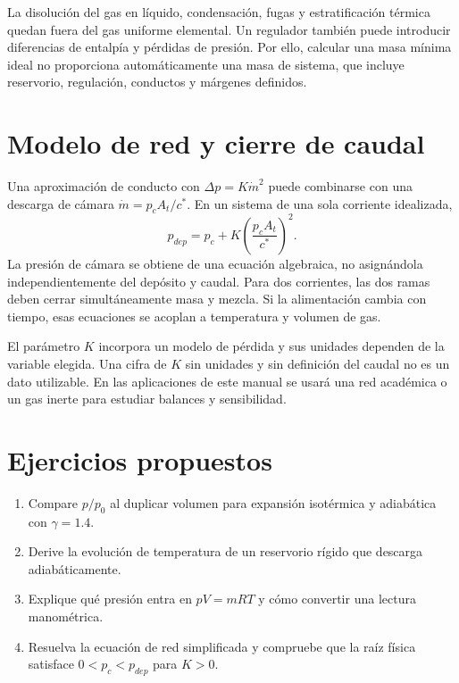 La disolución del gas en líquido, condensación, fugas y estratificación térmica quedan fuera del gas uniforme elemental. Un regulador también puede introducir diferencias de entalpía y pérdidas de presión. Por ello, calcular una masa mínima ideal no proporciona automáticamente una masa de sistema, que incluye reservorio, regulación, conductos y márgenes definidos.
\section{Modelo de red y cierre de caudal}
Una aproximación de conducto con $\Delta p=K\dot m^2$ puede combinarse con una descarga de cámara $\dot m=p_cA_t/c^*$. En un sistema de una sola corriente idealizada,
\[
 p_{dep}=p_c+K\left(\frac{p_cA_t}{c^*}\right)^2.
\]
La presión de cámara se obtiene de una ecuación algebraica, no asignándola independientemente del depósito y caudal. Para dos corrientes, las dos ramas deben cerrar simultáneamente masa y mezcla. Si la alimentación cambia con tiempo, esas ecuaciones se acoplan a temperatura y volumen de gas.

El parámetro $K$ incorpora un modelo de pérdida y sus unidades dependen de la variable elegida. Una cifra de $K$ sin unidades y sin definición del caudal no es un dato utilizable. En las aplicaciones de este manual se usará una red académica o un gas inerte para estudiar balances y sensibilidad.
\section{Ejercicios propuestos}
\begin{enumerate}
\item Compare $p/p_0$ al duplicar volumen para expansión isotérmica y adiabática con $\gamma=1.4$.
\item Derive la evolución de temperatura de un reservorio rígido que descarga adiabáticamente.
\item Explique qué presión entra en $pV=mRT$ y cómo convertir una lectura manométrica.
\item Resuelva la ecuación de red simplificada y compruebe que la raíz física satisface $0<p_c<p_{dep}$ para $K>0$.
\end{enumerate}
